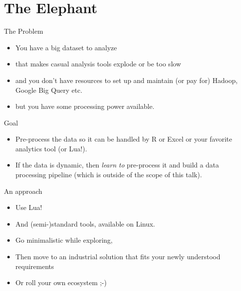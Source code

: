 \documentclass[handout]{beamer}
\begin{document}

\section{The Elephant}


\begin{frame}{The Problem}

\begin{itemize}
\item You have a big dataset to analyze
\item that makes casual analysis tools explode or be too slow
\item and you don't have resources to set up and maintain
      (or pay for) Hadoop, Google Big Query etc.
\item but you have some processing power available.
\end{itemize}

\end{frame}


\begin{frame}{Goal}

\begin{itemize}
\item Pre-process the data so it can be handled by R or Excel or your favorite
analytics tool (or Lua!).
\item If the data is dynamic, then \textit{learn to} pre-process it
      and build a data processing pipeline
      (which is outside of the scope of this talk).
\end{itemize}

\end{frame}


\begin{frame}{An approach}

\begin{itemize}
\item Use Lua!
\item And (semi-)standard tools, available on Linux.
\item Go minimalistic while exploring,
\item Then move to an industrial solution that fits your newly understood
      requirements
\item Or roll your own ecosystem ;-)
\end{itemize}

\end{frame}
\end{document}
